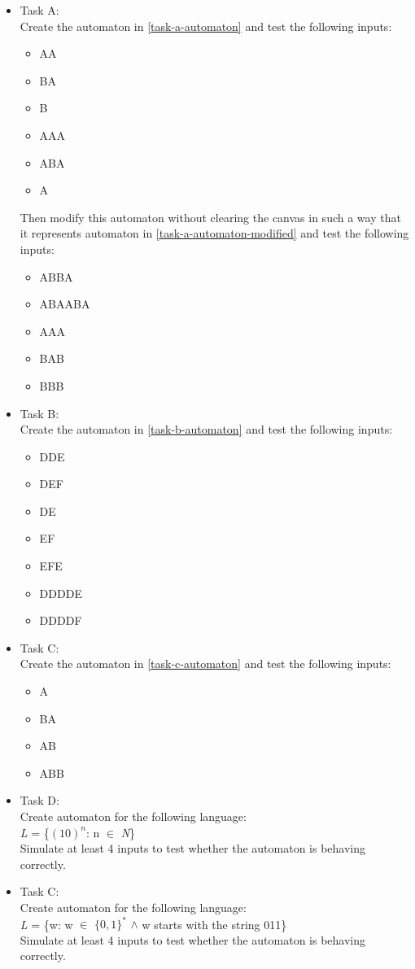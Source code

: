 \begin{itemize}
    \item Task A:\\ 
    Create the automaton in \ref{task-a-automaton} and test the following inputs:
    \begin{itemize}
        \item AA
        \item BA
        \item B
        \item AAA
        \item ABA
        \item A
    \end{itemize}
    Then modify this automaton without clearing the canvas in such a way that it represents automaton in \ref{task-a-automaton-modified} and test the following inputs:
    \begin{itemize}
        \item ABBA
        \item ABAABA
        \item AAA
        \item BAB
        \item BBB
    \end{itemize}
    \item Task B:\\ 
    Create the automaton in \ref{task-b-automaton} and test the following inputs:
    \begin{itemize}
        \item DDE
        \item DEF
        \item DE
        \item EF
        \item EFE
        \item DDDDE
        \item DDDDF
    \end{itemize}
    \item Task C:\\ 
    Create the automaton in \ref{task-c-automaton} and test the following inputs:
    \begin{itemize}
        \item A
        \item BA
        \item AB
        \item ABB
    \end{itemize}
    \item Task D:\\
    Create automaton for the following language:\\
    \textit{L} = \{$(10)^{n}$: n $\in$ \textit{N}\}\\
    Simulate at least 4 inputs to test whether the automaton is behaving correctly.
    \item Task C:\\
    Create automaton for the following language:\\
    \textit{L} = \{w: w $\in$ $\{0,1\}^{*}$ $\wedge$ w starts with the string 011\}\\
    Simulate at least 4 inputs to test whether the automaton is behaving correctly.
\end{itemize}

